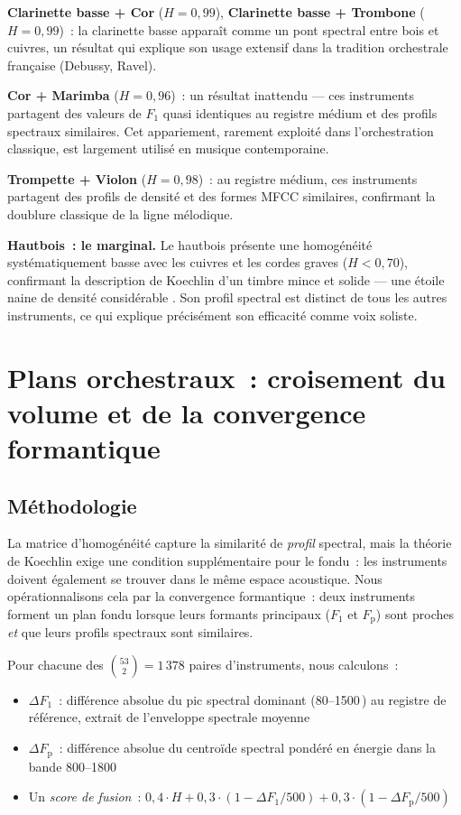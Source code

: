 \documentclass[journal]{IEEEtran}
\newcommand{\Fp}{F_\mathrm{p}}
\newcommand{\Hz}{\,\text{Hz}}
\begin{document}
\textbf{Clarinette basse + Cor} ($H = 0{,}99$), \textbf{Clarinette basse + Trombone} ($H = 0{,}99$)~: la clarinette basse apparaît comme un \og pont \fg{} spectral entre bois et cuivres, un résultat qui explique son usage extensif dans la tradition orchestrale française (Debussy, Ravel).

\textbf{Cor + Marimba} ($H = 0{,}96$)~: un résultat inattendu --- ces instruments partagent des valeurs de $F_1$ quasi identiques au registre médium et des profils spectraux similaires. Cet appariement, rarement exploité dans l'orchestration classique, est largement utilisé en musique contemporaine.

\textbf{Trompette + Violon} ($H = 0{,}98$)~: au registre médium, ces instruments partagent des profils de densité et des formes MFCC similaires, confirmant la doublure classique de la ligne mélodique.

\textbf{Hautbois~: le marginal.} Le hautbois présente une homogénéité systématiquement basse avec les cuivres et les cordes graves ($H < 0{,}70$), confirmant la description de Koechlin d'un timbre \og mince et solide \fg{} --- une \og étoile naine de densité considérable \fg. Son profil spectral est distinct de tous les autres instruments, ce qui explique précisément son efficacité comme voix soliste.

\section{Plans orchestraux~: croisement du volume et de la convergence formantique}
\label{sec:planes}

\subsection{Méthodologie}

La matrice d'homogénéité capture la similarité de \emph{profil} spectral, mais la théorie de Koechlin exige une condition supplémentaire pour le fondu~: les instruments doivent également se trouver dans le même \og espace \fg{} acoustique. Nous opérationnalisons cela par la convergence formantique~: deux instruments forment un plan fondu lorsque leurs formants principaux ($F_1$ et $\Fp$) sont proches \emph{et} que leurs profils spectraux sont similaires.

Pour chacune des $\binom{53}{2} = 1\,378$ paires d'instruments, nous calculons~:
\begin{itemize}[nosep]
\item $\Delta F_1$~: différence absolue du pic spectral dominant (80--1500\Hz) au registre de référence, extrait de l'enveloppe spectrale moyenne
\item $\Delta \Fp$~: différence absolue du centroïde spectral pondéré en énergie dans la bande 800--1800\Hz
\item Un \textit{score de fusion}~: $0{,}4 \cdot H + 0{,}3 \cdot (1 - \Delta F_1/500) + 0{,}3 \cdot (1 - \Delta\Fp/500)$
\end{itemize}
\end{document}
